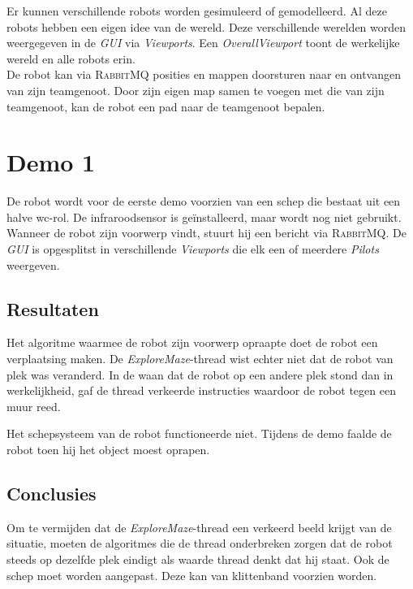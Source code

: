 \documentclass[eind]{penoverslag}
\begin{document}
Er kunnen verschillende robots worden gesimuleerd of gemodelleerd. Al deze robots hebben een eigen idee van de wereld. Deze verschillende werelden worden weergegeven in de \textit{GUI} via \textit{Viewports}. Een \textit{OverallViewport} toont de werkelijke wereld en alle robots erin.\\

De robot kan via \textsc{RabbitMQ} posities en mappen doorsturen naar en ontvangen van zijn teamgenoot. Door zijn eigen map samen te voegen met die van zijn teamgenoot, kan de robot een pad naar de teamgenoot bepalen.


\newpage
\makeappendix

\section{Demo 1}
\label{Asec:demo1}
De robot wordt voor de eerste demo voorzien van een schep die bestaat uit een halve wc-rol. De infraroodsensor is ge\"installeerd, maar wordt nog niet gebruikt. Wanneer de robot zijn voorwerp vindt, stuurt hij een bericht via \textsc{RabbitMQ}. De \textit{GUI} is opgesplitst in verschillende \textit{Viewports} die elk een of meerdere \textit{Pilots} weergeven.

\subsection{Resultaten}
\label{Assec:result1}
Het algoritme waarmee de robot zijn voorwerp opraapte doet de robot een verplaatsing maken. De \textit{ExploreMaze}-thread wist echter niet dat de robot van plek was veranderd. In de waan dat de robot op een andere plek stond dan in werkelijkheid, gaf de thread verkeerde instructies waardoor de robot tegen een muur reed.

Het schepsysteem van de robot functioneerde niet. Tijdens de demo faalde de robot toen hij het object moest oprapen. 

\subsection{Conclusies}
\label{Assec:conc1}
Om te vermijden dat de \textit{ExploreMaze}-thread een verkeerd beeld krijgt van de situatie, moeten de algoritmes die de thread onderbreken zorgen dat de robot steeds op dezelfde plek eindigt als waarde thread denkt dat hij staat.
Ook de schep moet worden aangepast. Deze kan van klittenband voorzien worden.
\end{document}
